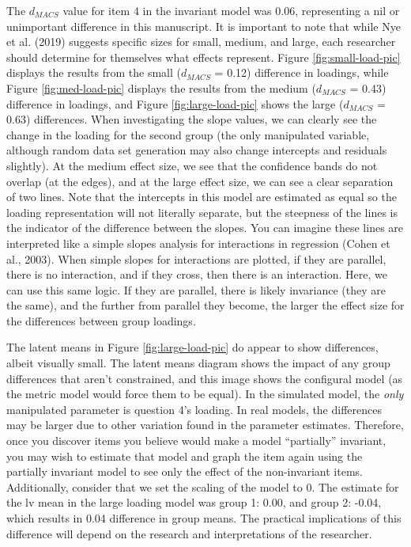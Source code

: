 \documentclass[
  man]{apa7}
\begin{document}
The \(d_{MACS}\) value for item 4 in the invariant model was 0.06, representing a nil or unimportant difference in this manuscript. It is important to note that while Nye et al. (2019) suggests specific sizes for small, medium, and large, each researcher should determine for themselves what effects represent. Figure \ref{fig:small-load-pic} displays the results from the small (\(d_{MACS}\) = 0.12) difference in loadings, while Figure \ref{fig:med-load-pic} displays the results from the medium (\(d_{MACS}\) = 0.43) difference in loadings, and Figure \ref{fig:large-load-pic} shows the large (\(d_{MACS}\) = 0.63) differences. When investigating the slope values, we can clearly see the change in the loading for the second group (the only manipulated variable, although random data set generation may also change intercepts and residuals slightly). At the medium effect size, we see that the confidence bands do not overlap (at the edges), and at the large effect size, we can see a clear separation of two lines. Note that the intercepts in this model are estimated as equal so the loading representation will not literally separate, but the steepness of the lines is the indicator of the difference between the slopes. You can imagine these lines are interpreted like a simple slopes analysis for interactions in regression (Cohen et al., 2003). When simple slopes for interactions are plotted, if they are parallel, there is no interaction, and if they cross, then there is an interaction. Here, we can use this same logic. If they are parallel, there is likely invariance (they are the same), and the further from parallel they become, the larger the effect size for the differences between group loadings.

The latent means in Figure \ref{fig:large-load-pic} do appear to show differences, albeit visually small. The latent means diagram shows the impact of any group differences that aren't constrained, and this image shows the configural model (as the metric model would force them to be equal). In the simulated model, the \emph{only} manipulated parameter is question 4's loading. In real models, the differences may be larger due to other variation found in the parameter estimates. Therefore, once you discover items you believe would make a model ``partially'' invariant, you may wish to estimate that model and graph the item again using the partially invariant model to see only the effect of the non-invariant items. Additionally, consider that we set the scaling of the model to 0. The estimate for the lv mean in the large loading model was group 1: 0.00, and group 2: -0.04, which results in 0.04 difference in group means. The practical implications of this difference will depend on the research and interpretations of the researcher.
\end{document}
